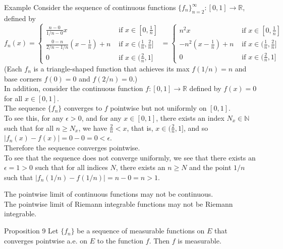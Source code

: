 \begin{flushleft}
    \begin{namedthm*}{Example}
        Consider the sequence of continuous functions $\{f_n\}_{n=2}^\infty:[0,1]\to\mathbb{R}$, defined by
        \[ 
		f_n(x) =
            \begin{cases} 
                \frac{n-0}{1/n-0}x& \text{ if } x \in [0,\frac{1}{n}]\\
                \frac{0-n}{2/n-1/n}(x-\frac{1}{n})+n & \text{ if } x \in (\frac{1}{n},\frac{2}{n}]\\
                0& \text{ if } x \in (\frac{2}{n},1]
            \end{cases}
            =
            \begin{cases} 
                n^2x& \text{ if } x \in [0,\frac{1}{n}]\\
                -n^2(x-\frac{1}{n})+n & \text{ if } x \in (\frac{1}{n},\frac{2}{n}]\\
                0& \text{ if } x \in (\frac{2}{n},1]
            \end{cases}
	    \]
        (Each $f_n$ is a triangle-shaped function that achieves its max $f(1/n)=n$ and base corners $f(0)=0$ and $f(2/n)=0$.)\\
        In addition, consider the continuous function $f:[0,1]\to\mathbb{R}$ defined by $f(x)=0$ for all $x\in[0,1]$.\\
        The sequence $\{f_n\}$ converges to $f$ pointwise but not uniformly on $[0,1]$.
        \\To see this, for any $\epsilon>0$, and for any $x\in[0,1]$, there exists an index $N_x\in\mathbb{N}$ such that for all $n\ge N_x$, we have $\frac{2}{n}<x$, that is, $x\in(\frac{2}{n},1]$, and so $|f_n(x)-f(x)|=0-0=0<\epsilon$.\\
        Therefore the sequence converges pointwise.\\
        To see that the sequence does not converge uniformly, we see that there exists an $\epsilon=1>0$ such that for all indices $N$, there exists an $n\ge N$ and the point $1/n$ such that $|f_n(1/n)-f(1/n)|=n-0=n>1$.
    \end{namedthm*}
    The pointwise limit of continuous functions may not be continuous.\\
    The pointwise limit of Riemann integrable functions may not be Riemann integrable.
    \begin{namedthm*}{Proposition 9}
        Let $\{f_n\}$ be a sequence of measurable functions on $E$ that converges pointwise a.e. on $E$ to the function $f$.
        Then $f$ is measurable.
    \end{namedthm*}


\end{flushleft}
